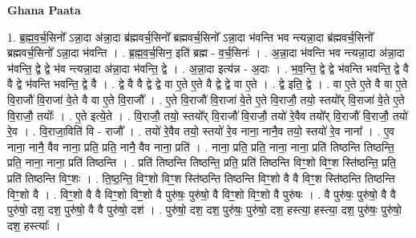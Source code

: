 \documentclass[17pt]{extarticle}
\begin{document}
\textbf{Ghana Paata } \newline

1. ब्र॒ह्म॒व॒र्च॒सिनो᳚ ऽन्ना॒दा अ॑न्ना॒दा ब्र॑ह्मवर्च॒सिनो᳚ ब्रह्मवर्च॒सिनो᳚ ऽन्ना॒दा भ॑वन्ति भव न्त्यन्ना॒दा ब्र॑ह्मवर्च॒सिनो᳚ ब्रह्मवर्च॒सिनो᳚ ऽन्ना॒दा भ॑वन्ति । . ब्र॒ह्म॒व॒र्च॒सिन॒ इति॑ ब्रह्म - व॒र्च॒सिनः॑ । . अ॒न्ना॒दा भ॑वन्ति भव न्त्यन्ना॒दा अ॑न्ना॒दा भ॑वन्ति॒ द्वे द्वे भ॑व न्त्यन्ना॒दा अ॑न्ना॒दा भ॑वन्ति॒ द्वे । . अ॒न्ना॒दा इत्य॑न्न - अ॒दाः । . भ॒व॒न्ति॒ द्वे द्वे भ॑वन्ति भवन्ति॒ द्वे वै वै द्वे भ॑वन्ति भवन्ति॒ द्वे वै । . द्वे वै वै द्वे द्वे वा ए॒ते ए॒ते वै द्वे द्वे वा ए॒ते । . द्वे इति॒ द्वे । . वा ए॒ते ए॒ते वै वा ए॒ते वि॒राजौ॑ वि॒राजा॑ वे॒ते वै वा ए॒ते वि॒राजौ᳚ । . ए॒ते वि॒राजौ॑ वि॒राजा॑ वे॒ते ए॒ते वि॒राजौ॒ तयो॒ स्तयो᳚र् वि॒राजा॑ वे॒ते ए॒ते वि॒राजौ॒ तयोः᳚ । . ए॒ते इत्ये॒ते । . वि॒राजौ॒ तयो॒ स्तयो᳚र् वि॒राजौ॑ वि॒राजौ॒ तयो॑ रे॒वैव तयो᳚र् वि॒राजौ॑ वि॒राजौ॒ तयो॑ रे॒व । . वि॒राजा॒विति॑ वि - राजौ᳚ । . तयो॑ रे॒वैव तयो॒ स्तयो॑ रे॒व नाना॒ नानै॒व तयो॒ स्तयो॑ रे॒व नाना᳚ । . ए॒व नाना॒ नानै॒ वैव नाना॒ प्रति॒ प्रति॒ नानै॒ वैव नाना॒ प्रति॑ । . नाना॒ प्रति॒ प्रति॒ नाना॒ नाना॒ प्रति॑ तिष्ठन्ति तिष्ठन्ति॒ प्रति॒ नाना॒ नाना॒ प्रति॑ तिष्ठन्ति । . प्रति॑ तिष्ठन्ति तिष्ठन्ति॒ प्रति॒ प्रति॑ तिष्ठन्ति विꣳ॒॒शो विꣳ॒॒श स्ति॑ष्ठन्ति॒ प्रति॒ प्रति॑ तिष्ठन्ति विꣳ॒॒शः । . ति॒ष्ठ॒न्ति॒ विꣳ॒॒शो विꣳ॒॒श स्ति॑ष्ठन्ति तिष्ठन्ति विꣳ॒॒शो वै वै विꣳ॒॒श स्ति॑ष्ठन्ति तिष्ठन्ति विꣳ॒॒शो वै । . विꣳ॒॒शो वै वै विꣳ॒॒शो विꣳ॒॒शो वै पुरु॑षः॒ पुरु॑षो॒ वै विꣳ॒॒शो विꣳ॒॒शो वै पुरु॑षः । . वै पुरु॑षः॒ पुरु॑षो॒ वै वै पुरु॑षो॒ दश॒ दश॒ पुरु॑षो॒ वै वै पुरु॑षो॒ दश॑ । . पुरु॑षो॒ दश॒ दश॒ पुरु॑षः॒ पुरु॑षो॒ दश॒ हस्त्या॒ हस्त्या॒ दश॒ पुरु॑षः॒ पुरु॑षो॒ दश॒ हस्त्याः᳚ । \newline
\end{document}
